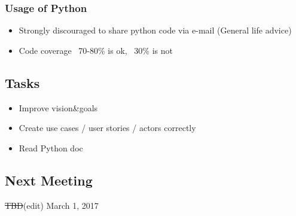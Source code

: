 	\subsubsection{Usage of Python}
	\begin{itemize}
		\item Strongly discouraged to share python code via e-mail (General life advice)
		\item Code coverage ~70-80\% is ok, ~30\% is not
        \end{itemize}
\subsection*{Tasks}
	\begin{itemize}
		\item Improve vision\&goals
		\item Create use cases / user stories / actors correctly
		\item Read Python doc
	\end{itemize}
\subsection*{Next Meeting}
\st{TBD}(edit)
March 1, 2017
